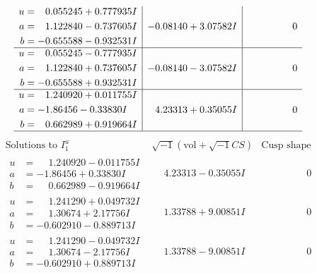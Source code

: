 \documentclass[1p]{elsarticle_modified}
\theoremstyle{definition}
\newcommand{\I}{\sqrt{-1}}
\begin{document}
$$\begin{array}{c|c|c}
\begin{aligned}
u &= \phantom{-}0.055245 + 0.777935 I \\
a &= \phantom{-}1.122840 - 0.737605 I \\
b &= -0.655588 - 0.932531 I\end{aligned}
 & -0.08140 + 3.07582 I & \phantom{-0.000000 } 0 \\ \hline\begin{aligned}
u &= \phantom{-}0.055245 - 0.777935 I \\
a &= \phantom{-}1.122840 + 0.737605 I \\
b &= -0.655588 + 0.932531 I\end{aligned}
 & -0.08140 - 3.07582 I & \phantom{-0.000000 } 0 \\ \hline\begin{aligned}
u &= \phantom{-}1.240920 + 0.011755 I \\
a &= -1.86456 - 0.33830 I \\
b &= \phantom{-}0.662989 + 0.919664 I\end{aligned}
 & \phantom{-}4.23313 + 0.35055 I & \phantom{-0.000000 } 0\\
 \hline 
 \end{array}$$\newpage$$\begin{array}{c|c|c}  
\text{Solutions to }I^u_{1}& \I (\text{vol} + \sqrt{-1}CS) & \text{Cusp shape}\\
 \hline 
\begin{aligned}
u &= \phantom{-}1.240920 - 0.011755 I \\
a &= -1.86456 + 0.33830 I \\
b &= \phantom{-}0.662989 - 0.919664 I\end{aligned}
 & \phantom{-}4.23313 - 0.35055 I & \phantom{-0.000000 } 0 \\ \hline\begin{aligned}
u &= \phantom{-}1.241290 + 0.049732 I \\
a &= \phantom{-}1.30674 + 2.17756 I \\
b &= -0.602910 - 0.889713 I\end{aligned}
 & \phantom{-}1.33788 + 9.00851 I & \phantom{-0.000000 } 0 \\ \hline\begin{aligned}
u &= \phantom{-}1.241290 - 0.049732 I \\
a &= \phantom{-}1.30674 - 2.17756 I \\
b &= -0.602910 + 0.889713 I\end{aligned}
 & \phantom{-}1.33788 - 9.00851 I & \phantom{-0.000000 } 0 \\ \hline\begin{aligned}

\end{aligned}
\end{array}$$
\end{document}
